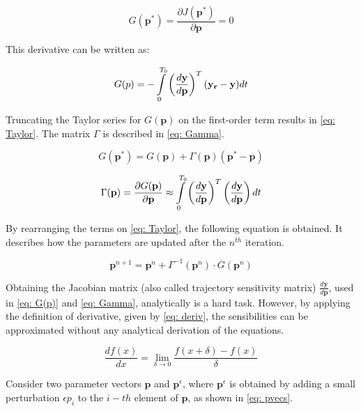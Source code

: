 \begin{equation}
	G(\mathbf{p}^{*}) = \frac{\partial J(\mathbf{p}^{*})}{\partial \mathbf{p}} = 0
\end{equation}

This derivative can be written as:

\begin{equation}	
	G(p) = -\int\displaylimits_{0}^{T_{0}} \left(\frac{d\mathbf{y}}{d\mathbf{p}}\right)^{T} (\mathbf{y_{r}} - \mathbf{y}) dt
	\label{eq: G(p)}
\end{equation}

Truncating the Taylor series for $G(\mathbf{p})$ on the first-order term results in \eqref{eq: Taylor}. The matrix $\Gamma$ is described in \eqref{eq: Gamma}.

\begin{equation}
	G(\mathbf{p}^{*}) = G(\mathbf{p}) + \Gamma (\mathbf{p})(\mathbf{p}^{*} - \mathbf{p})
	\label{eq: Taylor}
\end{equation}

\begin{equation}
	\Gamma (\mathbf{p}) = \frac{\partial G(\mathbf{p})}{\partial \mathbf{p}} \approx \int\displaylimits_{0}^{T_{0}} \left(\frac{d\mathbf{y}}{d\mathbf{p}}\right)^{T} \left(\frac{d\mathbf{y}}{d\mathbf{p}}\right) dt
	\label{eq: Gamma}
\end{equation}

By rearranging the terms on \eqref{eq: Taylor}, the following equation is obtained. It describes how the parameters are updated after the $n^{th}$ iteration.

\begin{equation}
	\mathbf{p}^{n+1} = \mathbf{p}^{n} + \Gamma^{-1}(\mathbf{p}^{n})\cdot G(\mathbf{p}^{n})
\end{equation}

Obtaining the Jacobian matrix (also called trajectory sensitivity matrix) $\frac{d\mathbf{y}}{d\mathbf{p}}$, used in \eqref{eq: G(p)} and \eqref{eq: Gamma}, analytically is a hard task. However, by applying the definition of derivative, given by \eqref{eq: deriv}, the sensibilities can be approximated without any analytical derivation of the equations.

\begin{equation}
	\frac{df(x)}{dx} = \lim\limits_{\delta \to 0} \frac{f(x + \delta) - f(x)}{\delta}
	\label{eq: deriv}
\end{equation}

Consider two parameter vectors $\mathbf{p}$ and $\mathbf{p}^{\epsilon}$, where $\mathbf{p}^{\epsilon}$ is obtained by adding a small perturbation $\epsilon p_{i}$ to the $i-th$ element of $\mathbf{p}$, as shown in \eqref{eq: pvecs}.

